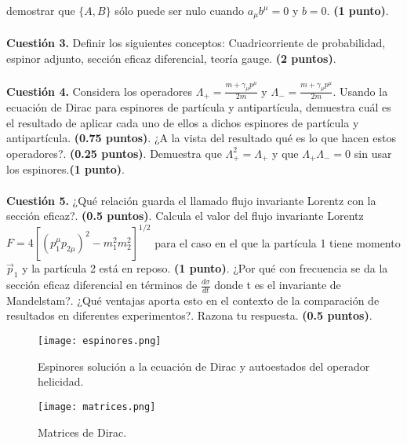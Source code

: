 \documentclass[paper=a4, fontsize=11pt]{scrartcl} %
\numberwithin{equation}{section} %
\numberwithin{figure}{section} %
\numberwithin{table}{section} %
\begin{document}
demostrar que $\{A,B\}$ sólo puede ser nulo cuando $a_\mu b^\mu=0$ y $b=0$. \textbf{(1 punto)}.   
\\
\\
\textbf{Cuestión 3.} Definir los siguientes conceptos: Cuadricorriente de probabilidad, espinor adjunto, sección eficaz diferencial, teoría gauge. \textbf{(2 puntos)}.
\\
\\
\textbf{Cuestión 4.} Considera los operadores $\Lambda_+ = \frac{m + \gamma_\mu p^\mu}{2m}$ y $\Lambda_- = \frac{m + \gamma_\mu p^\mu}{2m}$. Usando la ecuación
de Dirac para espinores de partícula y antipartícula, demuestra cuál es el resultado de aplicar cada uno de ellos a dichos espinores de partícula y antipartícula. \textbf{(0.75 puntos)}.
¿A la vista del resultado qué es lo que hacen estos operadores?. \textbf{(0.25 puntos)}. Demuestra que $\Lambda_+^2=\Lambda_+$ y que $\Lambda_+\Lambda_-=0$ sin usar
los espinores.\textbf{(1 punto)}.
\\
\\
\textbf{Cuestión 5.} ¿Qué relación guarda el llamado flujo invariante Lorentz con la sección eficaz?. \textbf{(0.5 puntos)}. Calcula el valor del flujo invariante Lorentz
$F=4[(p^\mu_1p_{2\mu})^2 - m_1^2 m_2^2]^{1/2}$ para el caso en el que la partícula 1 tiene momento $\vec{p}_1$ y la partícula 2 está en reposo. \textbf{(1 punto)}. ¿Por qué
con frecuencia se da la sección eficaz diferencial en términos de $\frac{d\sigma}{dt}$ donde t es el invariante de Mandelstam?. ¿Qué ventajas aporta esto en el contexto
de la comparación de resultados en diferentes experimentos?. Razona tu respuesta. \textbf{(0.5 puntos)}. 
  
\vspace{3cm}

\begin{figure}[!h]
\begin{center}
\texttt{[image: espinores.png]}
\end{center}
\caption{Espinores solución a la ecuación de Dirac y autoestados del operador helicidad.}
\label{espinores}
\end{figure}


\begin{figure}[!h]
\begin{center}
\texttt{[image: matrices.png]}
\end{center}
\caption{Matrices de Dirac.}
\label{matrices}
\end{figure}
\end{document}
